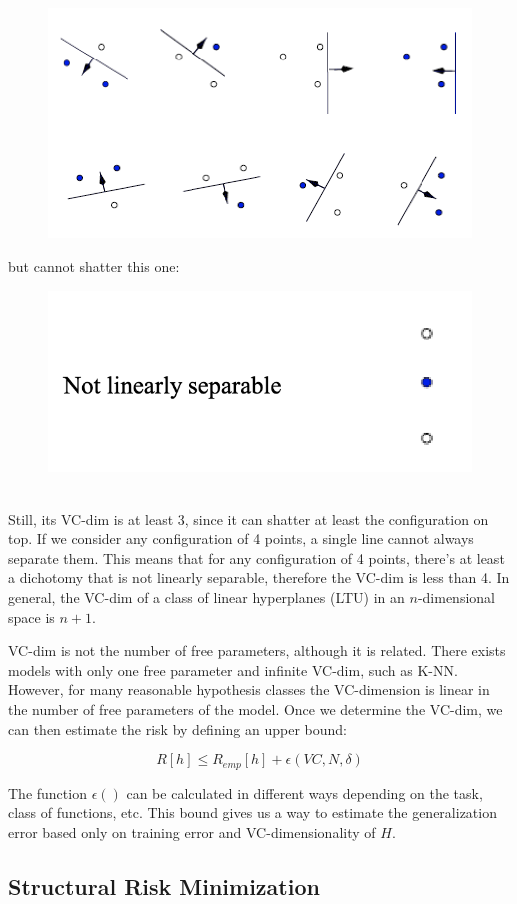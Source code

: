 \begin{figure}[h]
    \centering
    \includegraphics[width=0.5\linewidth]{img/shattering_1.png} 
\end{figure}
but cannot shatter this one:
\begin{figure}[h]
    \centering
    \includegraphics[width=0.5\linewidth]{img/Shattering_2.png}
\end{figure}\\
Still, its VC-dim is at least 3, since it can shatter at least the configuration on top. If we consider any configuration of 4 points, a single line cannot always separate them. This means that for any configuration of 4 points, there's at least a dichotomy that is not linearly separable, therefore the VC-dim is less than 4. In general, the VC-dim of a class of linear hyperplanes (LTU) in an $n$-dimensional space is $n+1$.

VC-dim is not the number of free parameters, although it is related. There exists models with only one free parameter and infinite VC-dim, such as K-NN. However, for many reasonable hypothesis classes the VC-dimension is linear in the number of free parameters of the model. Once we determine the VC-dim, we can then estimate the risk by defining an upper bound:

\begin{equation*}
    R[h] \leq R_{emp}[h] + \epsilon (VC,N,\delta)
\end{equation*}

The function $\epsilon()$ can be calculated in different ways depending on the task, class of functions, etc. This bound gives us a way to estimate the generalization error based only on training error and VC-dimensionality of $H$.

\subsection{Structural Risk Minimization}

